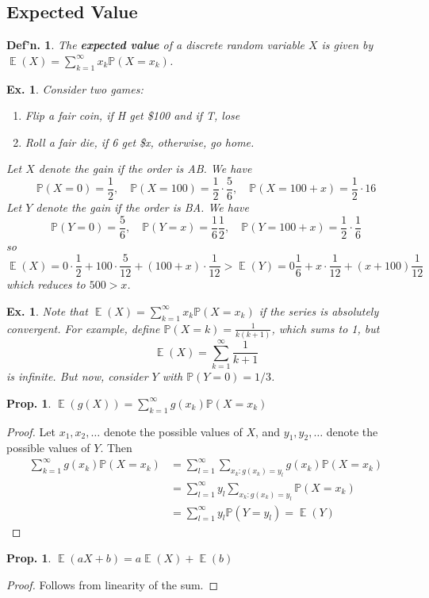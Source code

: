\documentclass[12pt, a4paper]{book}
\DeclareMathOperator{\E}{\mathbb{E}}
\renewcommand{\Pr}{\mathbb{P}}
\newtheorem{definition}[theorem]{Def'n.}
\newtheorem{proposition}[theorem]{Prop.}
\newtheorem{example}[theorem]{Ex.}
\theoremstyle{nonumberplain}
\newtheorem{proof}{Proof}
\begin{document}
\subsection{Expected Value}
\begin{definition}
    The \textbf{expected value} of a discrete random variable $X$ is given by $\E(X)=\sum\limits_{k=1}^\infty x_k\Pr(X=x_k)$.
\end{definition}
\begin{example}
    Consider two games:
    \begin{enumerate}
        \item Flip a fair coin, if H get \$100 and if T, lose
        \item Roll a fair die, if 6 get \$x, otherwise, go home.
    \end{enumerate}
    Let $X$ denote the gain if the order is AB.
    We have
    \[\Pr(X=0)=\frac{1}{2},\quad\Pr(X=100)=\frac{1}{2}\cdot\frac{5}{6},\quad\Pr(X=100+x)=\frac{1}{2}\cdot{1}{6}\]
    Let $Y$ denote the gain if the order is BA.
    We have
    \[\Pr(Y=0)=\frac{5}{6},\quad\Pr(Y=x)=\frac{1}{6}\frac{1}{2},\quad\Pr(Y=100+x)=\frac{1}{2}\cdot\frac{1}{6}\]
    so
    \[\E(X)=0\cdot\frac{1}{2}+100\cdot\frac{5}{12}+(100+x)\cdot\frac{1}{12}>\E(Y)=0\frac{1}{6}+x\cdot\frac{1}{12}+(x+100)\frac{1}{12}\]
    which reduces to $500>x$.
\end{example}
\begin{example}
    Note that $\E(X)=\sum\limits_{k=1}^\infty x_k\Pr(X=x_k)$ if the series is absolutely convergent.
    For example, define $\Pr(X=k)=\frac{1}{k(k+1)}$, which sums to 1, but
    \[\E(X)=\sum\limits_{k=1}^\infty\frac{1}{k+1}\]
    is infinite.
    But now, consider $Y$ with $\Pr(Y=0)=1/3$.
\end{example}
\begin{proposition}
    $\E(g(X))=\sum\limits_{k=1}^\infty g(x_k)\Pr(X=x_k)$
\end{proposition}
\begin{proof}
    Let $x_1,x_2,\ldots$ denote the possible values of $X$, and $y_1,y_2,\ldots$ denote the possible values of $Y$.
    Then
    \begin{align*}
        \sum\limits_{k=1}^\infty g(x_k)\Pr(X=x_k) &= \sum\limits_{l=1}^\infty\sum\limits_{x_k:g(x_k)=y_l}g(x_k)\Pr(X=x_k)\\
                                                  &= \sum\limits_{l=1}^\infty y_l\sum\limits_{x_k:g(x_k)=y_l}\Pr(X=x_k)\\
                                                  &= \sum\limits_{l=1}^\infty y_l\Pr(Y=y_l)=\E(Y)
    \end{align*}
\end{proof}
\begin{proposition}
    $\E(aX+b)=a\E(X)+\E(b)$
\end{proposition}
\begin{proof}
    Follows from linearity of the sum.
\end{proof}
\end{document}
